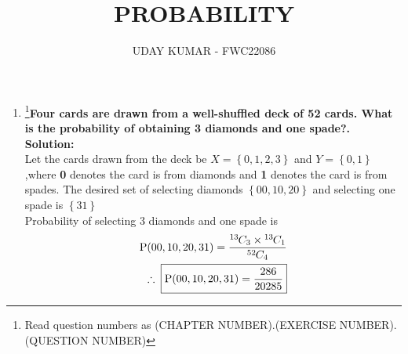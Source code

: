 \documentclass{article}
\providecommand{\cbrak}[1]{\ensuremath{\left\{#1\right\}}}
\newcommand{\solution}{\noindent \textbf{Solution: }}
\newcommand*{\permcomb}[4][0mu]{{{}^{#3}\mkern#1#2_{#4}}}
\newcommand*{\comb}[1][-1mu]{\permcomb[#1]{C}}
\begin{document}
\title{PROBABILITY}
\author{\Large UDAY KUMAR - FWC22086}
\date{}

\maketitle

\begin{enumerate}[label=16.\arabic{enumi}.\arabic{enumii}]%
\setcounter{enumi}{3}
\setcounter{enumii}{2}

\item \footnote{Read question numbers as (CHAPTER NUMBER).(EXERCISE NUMBER).(QUESTION NUMBER)}\textbf {Four cards are drawn from a well-shuffled deck of 52 cards. What is the probability of obtaining 3 diamonds and one spade?.}\\[1ex]
	\solution\\
		Let the cards drawn from the deck be $X = \cbrak{0,1,2,3}$ and $Y = \cbrak{0,1}$,where \textbf 0 denotes the card is from diamonds and \textbf 1 denotes the card is from spades.
		 The desired set of selecting diamonds $\cbrak{00,10,20}$
 and selecting one spade is $\cbrak{ 31 }$\\

Probability of selecting 3 diamonds and one spade is 
	\begin{align*}
	   \text{P}{(00,10,20,31)} =\dfrac{\comb{13}{3} \times \comb{13}{1}}{\comb{52}{4}}\\ 
\therefore \; \boxed{\text{P}{(00,10,20,31)} = \frac{286}{20285}}\\
\end{align*}
		
	
		
    

\end{enumerate}
\end{document}
